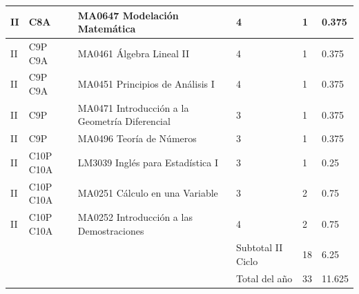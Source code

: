 \begin{longtable}[c]{|p{0.8cm}|p{1.8cm}|p{6.8cm}|p{1.5cm}|p{1.3cm}|p{1.5cm}|}
II & C8A & MA0647 Modelación Matemática & 4 & 1 & 0.375 \\ \hline
II & C9P C9A & MA0461 Álgebra Lineal II & 4 & 1 & 0.375 \\ \hline
II & C9P C9A & MA0451 Principios de Análisis I & 4 & 1 & 0.375 \\ \hline
II & C9P & MA0471 Introducción a la Geometría Diferencial & 3 & 1 & 0.375 \\ \hline
II & C9P & MA0496 Teoría de Números & 3 & 1 & 0.375 \\ \hline
II & C10P C10A & LM3039 Inglés para Estadística I & 3 & 1 & 0.25 \\ \hline
II & C10P C10A & MA0251 Cálculo en una Variable & 3 & 2 & 0.75 \\ \hline
II & C10P C10A & MA0252 Introducción a las Demostraciones & 4 & 2 & 0.75 \\ \hline
 &  &  & Subtotal II Ciclo & 18 & 6.25 \\ \hline
 &  &  & Total del año & 33 & 11.625 \\ \hline
\end{longtable}


